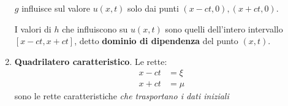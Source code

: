 \documentclass[10pt,a4paper,twoside,openright]{book}
\begin{document}
\begin{enumerate}
          $g$ influisce sul valore $\displaystyle u(x,t)$ solo dai punti $\displaystyle (x-ct,0) ,(x+ct,0)$.

          I valori di $h$ che influiscono su $\displaystyle u(x,t)$ sono quelli dell'intero intervallo $\displaystyle [ x-ct,x+ct]$, detto \textbf{dominio di dipendenza }del punto $\displaystyle (x,t)$.
    \item \textbf{Quadrilatero caratteristico}. Le rette:
          \begin{align*}
              x-ct & =\xi \\
              x+ct & =\mu
          \end{align*}
          sono le rette caratteristiche \emph{che trasportano i dati iniziali}
          \begin{figure}[htpb]
              \centering


              \begin{tikzpicture}[x=0.75pt,y=0.75pt,yscale=-1,xscale=1]


\end{tikzpicture}
\end{figure}
\end{enumerate}
\end{document}
